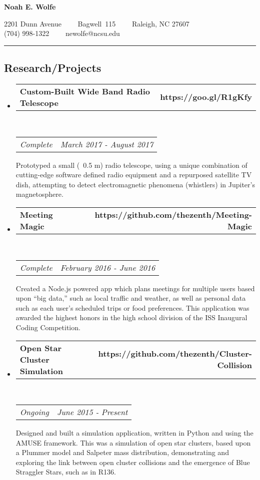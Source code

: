 \documentclass[10pt,letterpaper]{article}
\makeatletter
\newcommand{\headerrow}[2]
{\begin{tabular*}{\linewidth}{l@{\extracolsep{\fill}}r}
	#1 &
	#2 \\
\end{tabular*}}
\newcommand{\basicitem}[5]
{
	\item
	\headerrow
		{\textbf{#1}}
		{\textbf{#2}}
	\\
	\headerrow
		{\emph{#3}}
		{\emph{#4}}

	#5

}
\makeatother
\begin{document}
\begin{center}
{\LARGE \textbf{Noah E. Wolfe}}

2201 Dunn Avenue\ \ \textbullet
\ \ Bagwell\ 115\ \ \textbullet
\ \ Raleigh, NC 27607
\\
(704) 998-1322\ \ \textbullet
\ \ newolfe@ncsu.edu
\end{center}

\hrule
\vspace{-0.4em}
\subsection*{Research/Projects}

\begin{itemize}
	\parskip=0.1em

	\basicitem
		{Custom-Built Wide Band Radio Telescope}
		{https://goo.gl/R1gKfy}
		{Complete}
		{March 2017 - August 2017}
		{Prototyped a small (~0.5 m) radio telescope, using a unique combination of cutting-edge software defined radio equipment and a repurposed satellite TV dish, attempting to detect electromagnetic phenomena (whistlers) in Jupiter’s magnetosphere.}

	\item
	\headerrow
		{\textbf{Meeting Magic}}
		{\textbf{https://github.com/thezenth/Meeting-Magic}}
	\\
	\headerrow
		{\emph{Complete}}
		{\emph{February 2016 - June 2016}}
	\begin{itemize*}
		Created a Node.js powered app which plans meetings for multiple users based upon “big data,” such as local traffic and weather, as well as personal data such as each user’s scheduled trips or food preferences. This application was awarded the highest honors in the high school division of the ISS Inaugural Coding Competition.
	\end{itemize*}

	\item
	\headerrow
		{\textbf{Open Star Cluster Simulation}}
		{\textbf{https://github.com/thezenth/Cluster-Collision}}
	\\
	\headerrow
		{\emph{Ongoing}}
		{\emph{June 2015 - Present}}
	\begin{itemize*}
		Designed and built a simulation application, written in Python and using the AMUSE framework. This was a simulation of open star clusters, based upon a Plummer model and Salpeter mass distribution, demonstrating and exploring the link between open cluster collisions and the emergence of Blue Straggler Stars, such as in R136. 
	\end{itemize*}

\end{itemize}
\end{document}
